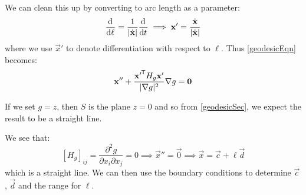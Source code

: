 \documentclass[../main.tex]{subfiles}
\begin{document}
We can clean this up by converting to arc length as a parameter:
\[
  \deriv{}{\ell} = \frac{1}{|\dot{\vec{x}}|} \deriv{}{t} \implies \vec{x}' = \frac{\dot{\vec{x}}}{|\dot{\vec{x}}|}
\]
where we use $\vec{x}'$ to denote differentiation with respect to $\ell$.
Thus \cref{geodesicEqn} becomes:
\[
  \mathbf{\bm{x}}'' + \frac{{\mathbf{\bm{x}}'}^{{\mkern-1.5mu\mathsf{T}}} H_g \mathbf{\bm{x}}'}{|\nabla g|^2} \nabla g = \mathbf{\bm{0}}
\]
\begin{example}
  If we set $g = z$, then $S$ is the plane $z = 0$ and so from \cref{geodesicSec}, we expect the result to be a straight line.

  We see that:
  \[
    [H_g]_{i j} = \frac{\partial^2 g}{\partial x_i \partial x_j} = 0 \implies \vec{x}'' = \vec{0}  \implies \vec{x} = \vec{c} + \ell \vec{d}
  \]
  which is a straight line.
  We can then use the boundary conditions to determine $\vec{c}$, $\vec{d}$ and the range for $\ell$.
\end{example}
\end{document}

